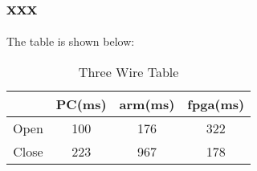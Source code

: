 \documentclass[UTF8,12pt]{article}
\begin{document}
\subsection{xxx}
\lipsum[11]
The table is shown below:
\begin{table}[H]
	\centering
	\caption{Three Wire Table}
	\label{fig3}
	\begin{tabular}{cccc}
		\toprule
		&PC(ms) &arm(ms) &fpga(ms)\\
		\midrule
		Open &100 &176 &322\\
		Close &223 &967 &178\\
		\bottomrule	
	\end{tabular}
\end{table}

\newpage
\begingroup
    \linespread{1}
    \printbibliography[title={Reference}]
\endgroup
\end{document}
